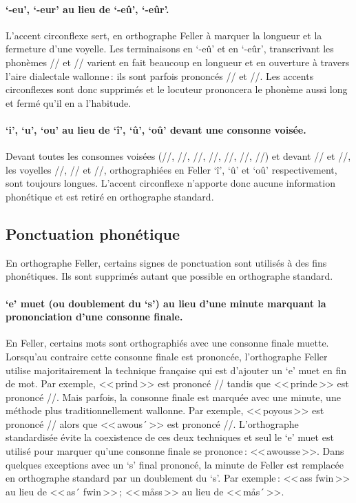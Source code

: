 \documentclass[french]{article}
\begin{document}
\paragraph{`-eu', `-eur' au lieu de `-eû', `-eûr'.} L'accent circonflexe sert, en orthographe Feller à marquer la longueur et la fermeture d'une voyelle. Les terminaisons en `-eû' et en `-eûr', transcrivant les phonèmes /\textipa{\o:}/ et // varient en fait beaucoup en longueur et en ouverture à travers l'aire dialectale wallonne\,: ils sont parfois prononcés /\textipa{\oe}/ et //. Les accents circonflexes sont donc supprimés et le locuteur prononcera le phonème aussi long et fermé qu'il en a l'habitude.

\paragraph{`i', `u', `ou' au lieu de `î', `û', `oû' devant une consonne voisée.} Devant toutes les consonnes voisées (//, //, //, //, //, //, //) et devant // et //, les voyelles //, // et //, orthographiées en Feller `î', `û' et `oû' respectivement, sont toujours longues. L'accent circonflexe n'apporte donc aucune information phonétique et est retiré en orthographe standard.

\subsection{Ponctuation phonétique}

En orthographe Feller, certains signes de ponctuation sont utilisés à des fins phonétiques. Ils sont supprimés autant que possible en orthographe standard.

\paragraph{`e' muet (ou doublement du `s') au lieu d'une minute marquant la prononciation d'une consonne finale.} En Feller, certains mots sont orthographiés avec une consonne finale muette. Lorsqu'au contraire cette consonne finale est prononcée, l'orthographe Feller utilise majoritairement la technique française qui est d'ajouter un `e' muet en fin de mot. Par exemple, <<\,prind\,>> est prononcé // tandis que <<\,prinde\,>> est prononcé //. Mais parfois, la consonne finale est marquée avec une minute, une méthode plus traditionnellement wallonne. Par exemple, <<\,poyous\,>> est prononcé // alors que <<\,awous´\,>> est prononcé //. L'orthographe standardisée évite la coexistence de ces deux techniques et seul le `e' muet est utilisé pour marquer qu'une consonne finale se prononce\,: <<\,awousse\,>>. Dans quelques exceptions avec un `s' final prononcé, la minute de Feller est remplacée en orthographe standard par un doublement du `s'. Par exemple\,: <<\,ass fwin\,>> au lieu de <<\,as´ fwin\,>>\,; <<\,måss\,>> au lieu de <<\,mås´\,>>.
\end{document}
